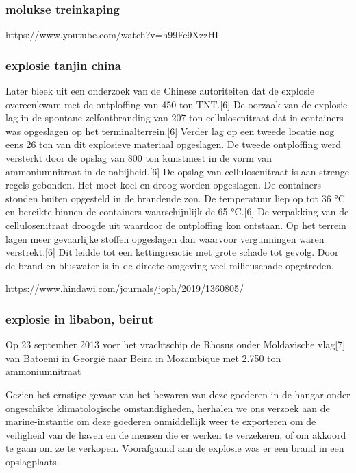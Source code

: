 \subsubsection{molukse treinkaping }
https://www.youtube.com/watch?v=h99Fe9XzzHI 

\subsubsection{explosie tanjin china 
}

Later bleek uit een onderzoek van de Chinese autoriteiten dat de explosie overeenkwam met de ontploffing van 450 ton TNT.[6] 
De oorzaak van de explosie lag in de spontane zelfontbranding van 207 ton cellulosenitraat dat in containers was opgeslagen op het terminalterrein.[6] 
Verder lag op een tweede locatie nog eens 26 ton van dit explosieve materiaal opgeslagen.
De tweede ontploffing werd versterkt door de opslag van 800 ton kunstmest in de vorm van ammoniumnitraat in de nabijheid.[6]
De opslag van cellulosenitraat is aan strenge regels gebonden. Het moet koel en droog worden opgeslagen. De containers stonden buiten opgesteld in de brandende zon. De temperatuur liep op tot 36 °C en bereikte binnen de containers waarschijnlijk de 65 °C.[6] De verpakking van de cellulosenitraat droogde uit waardoor de ontploffing kon ontstaan. Op het terrein lagen meer gevaarlijke stoffen opgeslagen dan waarvoor vergunningen waren verstrekt.[6] Dit leidde tot een kettingreactie met grote schade tot gevolg. Door de brand en bluswater is in de directe omgeving veel milieuschade opgetreden.


https://www.hindawi.com/journals/joph/2019/1360805/ 



\subsubsection{explosie in libabon, beirut 
}

Op 23 september 2013 voer het vrachtschip de Rhosus onder Moldavische vlag[7] van Batoemi in Georgië naar Beira in Mozambique met 2.750 ton ammoniumnitraat

Gezien het ernstige gevaar van het bewaren van deze goederen in de hangar onder ongeschikte klimatologische omstandigheden, herhalen we ons verzoek aan de marine-instantie om deze goederen onmiddellijk weer te exporteren om de veiligheid van de haven en de mensen die er werken te verzekeren, of om akkoord te gaan om ze te verkopen.
Voorafgaand aan de explosie was er een brand in een opslagplaats. 

